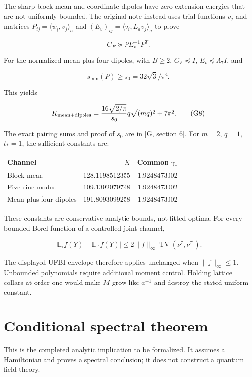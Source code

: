 \documentclass[
  11pt,
  letterpaper,
]{article}
\begin{document}
The sharp block mean and coordinate dipoles have zero-extension energies
that are not uniformly bounded. The original note instead uses trial
functions \(v_j\) and matrices \(P_{ij}=\langle\psi_i,v_j\rangle_a\) and
\((E_v)_{ij}=\langle v_i,L_av_j\rangle_a\) to prove

\[
C_F\succeq P E_v^{-1}P^T.
\]

For the normalized mean plus four dipoles, with \(B\ge2\),
\(G_F\preceq I\), \(E_v\preceq\Lambda_7 I\), and

\[
s_{\min}(P)\ge s_0=32\sqrt3/\pi^4.
\]

This yields

\[
K_{\rm mean+dipoles}=
\frac{16\sqrt{2/\pi}}{s_0}q\sqrt{(mq)^2+7\pi^2}.
\tag{G8}
\]

The exact pairing sums and proof of \(s_0\) are in {[}G, section 6{]}.
For \(m=2\), \(q=1\), \(t_*=1\), the sufficient constants are:

\begin{longtable}[]{@{}lrr@{}}
\toprule\noalign{}
Channel & \(K\) & Common \(\gamma_*\) \\
\midrule\noalign{}
\endhead
\bottomrule\noalign{}
\endlastfoot
Block mean & 128.1198512355 & 1.9248473002 \\
Five sine modes & 109.1392079748 & 1.9248473002 \\
Mean plus four dipoles & 191.8093099258 & 1.9248473002 \\
\end{longtable}

These constants are conservative analytic bounds, not fitted optima. For
every bounded Borel function of a controlled joint channel,

\[
|\mathbb E_\tau f(Y)-\mathbb E_{\tau'}f(Y)|
\le2\|f\|_\infty\operatorname{TV}(\nu^\tau,\nu^{\tau'}).
\]

The displayed UFBI envelope therefore applies unchanged when
\(\|f\|_\infty\le1\). Unbounded polynomials require additional moment
control. Holding lattice collars at order one would make \(M\) grow like
\(a^{-1}\) and destroy the stated uniform constant.

\section{Conditional spectral
theorem}\label{conditional-spectral-theorem}

This is the completed analytic implication to be formalized. It assumes
a Hamiltonian and proves a spectral conclusion; it does not construct a
quantum field theory.
\end{document}
